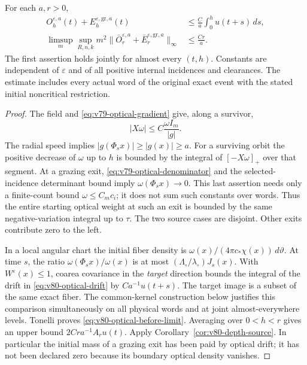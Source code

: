 \begin{theorem}
\label{thm:v80-noncritical-optical}
For each $a,r>0$,
\begin{align}
 O_h^{\varepsilon,a}(t)+E_h^{\varepsilon,\mathrm{gr},a}(t)
          &\le \frac C a\int_0^h u(t+s)\,ds,
                                      \label{eq:v80-optical-before-limit}\\
 \limsup_m\sup_{R,n,k}m^2
  \|\bar O_r^{\varepsilon,a}
                +\bar E_r^{\varepsilon,\mathrm{gr},a}\|_\infty
          &\le \frac{Cr}{a}.          \label{eq:v80-optical-height}
\end{align}
The first assertion holds jointly for almost every $(t,h)$.
Constants are independent of $\varepsilon$ and of all positive
internal incidences and clearances. The estimate includes every
actual word of the original exact event with the stated initial
noncritical restriction.
\end{theorem}
\begin{proof}
The field and \eqref{eq:v79-optical-gradient} give, along a survivor,
\begin{equation}\label{eq:v80-optical-drift}
 |X\omega|\le C\frac{\omega I_m}{|g|}.
\end{equation}
The radial speed implies $|g(\Phi_sx)|\ge|g(x)|\ge a$.
For a surviving orbit the positive decrease of $\omega$ up to $h$
is bounded by the integral of $[-X\omega]_+$ over that segment.
At a grazing exit, \eqref{eq:v79-optical-denominator} and the
selected-incidence determinant bound imply $\omega(\Phi_sx)\to0$.
This last assertion needs only a finite-count bound
$\omega\le C_m c_i$; it does not sum such constants over words.
Thus the entire starting optical weight at such an exit is bounded
by the same negative-variation integral up to $\tau$. The two
source cases are disjoint. Other exits contribute zero to the left.

In a local angular chart the initial fiber density is
$\omega(x)/(4\pi c_*\chi(x))\,d\vartheta$. At time $s$, the ratio
$\omega(\Phi_sx)/\omega(x)$ is at most
$(\Lambda_\circ/\lambda_\circ)J_s(x)$. With $W^\varepsilon(x)\le1$,
coarea covariance in the \emph{target} direction bounds the integral
of the drift in \eqref{eq:v80-optical-drift} by
$Ca^{-1}u(t+s)$. The target image is a subset of the same exact
fiber. The common-kernel construction below justifies this comparison
simultaneously on all physical words and at joint almost-everywhere
levels. Tonelli proves \eqref{eq:v80-optical-before-limit}.
Averaging over $0<h<r$ gives an upper bound
$2Cr a^{-1}A_r u(t)$. Apply Corollary~\ref{cor:v80-depth-source}.
In particular the initial mass of a grazing exit has been paid by
optical drift; it has not been declared zero because its boundary
optical density vanishes.
\end{proof}

